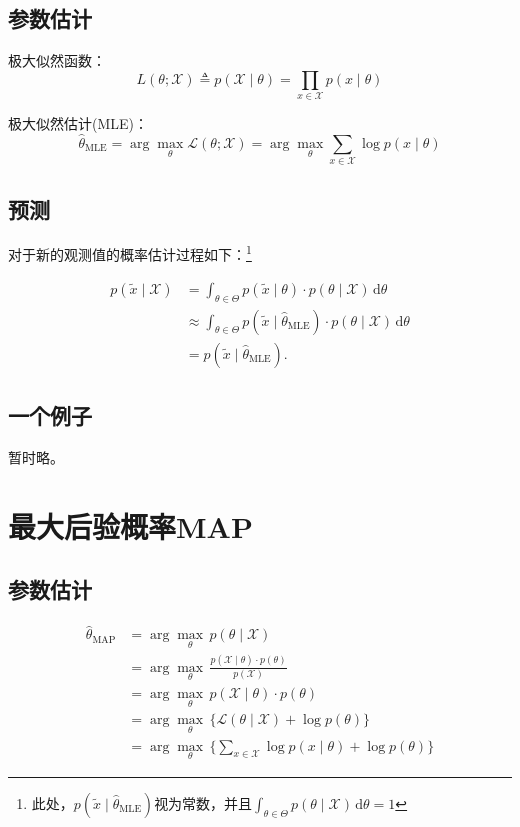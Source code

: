 \documentclass[utf8]{ctexart}
\begin{document}
\subsection{参数估计}
极大似然函数：
\begin{equation}\label{eq3}
L(\theta ; \mathcal{X}) \triangleq p(\mathcal{X} \mid \theta) = \prod_{x \in \mathcal{X}} p(x \mid \theta)
\end{equation}

极大似然估计(MLE)：
\begin{equation}\label{eq4}
\hat{\theta}_{\text{MLE}} = \arg \max_\theta \mathcal{L}(\theta ; \mathcal{X}) =  \arg \max_\theta \sum_{x\in \mathcal{X}} \log p(x \mid \theta)
\end{equation}

\subsection{预测}
对于新的观测值的概率估计过程如下：\footnote{此处，$p(\tilde{x} \mid \hat{\theta}_{\text{MLE}})$视为常数，并且$\int_{\theta \in \Theta} p(\theta \mid \mathcal{X}) \, \text{d} \theta = 1$}

\begin{align}
p(\tilde{x} \mid \mathcal{X}) 
	&= \int_{\theta \in \Theta} p(\tilde{x} \mid \theta) \cdot p(\theta \mid \mathcal{X}) \, \text{d} \theta \\
	&\approx \int_{\theta \in \Theta} p(\tilde{x} \mid \hat{\theta}_{\text{MLE}}) \cdot p(\theta \mid \mathcal{X}) \, \text{d} \theta  \\
	&= p(\tilde{x} \mid \hat{\theta}_{\text{MLE}}).
\end{align}


\subsection{一个例子}
暂时略。

\section{最大后验概率MAP}
\subsection{参数估计}
\begin{align}
\hat{\theta}_{\text{MAP}} &= \arg \max_\theta \, p(\theta \mid \mathcal{X})	\\
	&= \arg \max_\theta \, \frac{p(\mathcal{X} \mid \theta) \cdot p(\theta)}{p(\mathcal{X})} \\
	&= \arg \max_\theta \, p(\mathcal{X} \mid \theta) \cdot p(\theta) \\
	&= \arg \max_\theta \, \lbrace  \mathcal{L}(\theta \mid \mathcal{X}) + \log p(\theta)  \rbrace \\
	&= \arg \max_\theta \, \lbrace \sum_{x \in \mathcal{X}} \log p(x \mid \theta) + \log p(\theta) \rbrace
\end{align}
\end{document}
